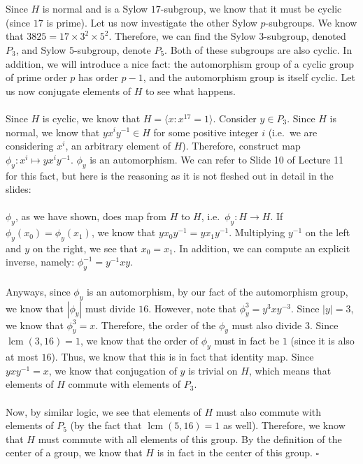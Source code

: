 \documentclass[letterpaper]{article}
\newcommand*{\QED}{\hfill\ensuremath{\square}}%
\DeclareMathOperator{\lcm}{lcm}
\begin{document}
\section{}
\label{sec:Question5}

Since $ H $ is normal and is a Sylow $ 17 $-subgroup, we know that it must be cyclic (since $ 17 $ is prime).
Let us now investigate the other Sylow $ p $-subgroups.
We know that $ 3825 = 17 \times 3^2 \times 5^2 $.
Therefore, we can find the Sylow $ 3 $-subgroup, denoted $ P_3 $, and Sylow $ 5 $-subgroup, denote $ P_5 $.
Both of these subgroups are also cyclic.
In addition, we will introduce a nice fact: the automorphism group of a cyclic group of prime order $ p $ has order $ p - 1 $, and the automorphism group is itself cyclic.
Let us now conjugate elements of $ H $ to see what happens.
\\ \\
Since $ H $ is cyclic, we know that $ H = \langle x : x^{17} = 1 \rangle $.
Consider $ y \in P_3 $.
Since $ H $ is normal, we know that $ y x^i y^{-1} \in H $ for some positive integer $ i $ (i.e.\ we are considering $ x^i $, an arbitrary element of $ H $).
Therefore, construct map $ \phi_y : x^i \mapsto y x^i y^{-1} $.
$ \phi_y $ is an automorphism.
We can refer to Slide 10 of Lecture 11 for this fact, but here is the reasoning as it is not fleshed out in detail in the slides:
\\ \\
$ \phi_y $, as we have shown, does map from $ H $ to $ H $, i.e.\ $ \phi_y : H \to H $.
If $ \phi_y (x_0) = \phi_y(x_1) $, we know that $ y x_0 y^{-1} = y x_1 y^{-1} $.
Multiplying $ y^{-1} $ on the left and $ y $ on the right, we see that $ x_0 = x_1 $.
In addition, we can compute an explicit inverse, namely: $ \phi_y^{-1} = y^{-1} x y $.
\\ \\
Anyways, since $ \phi_y $ is an automorphism, by our fact of the automorphism group, we know that $ | \phi_y | $ must divide $ 16 $.
However, note that $ \phi_y^3 = y^{3} x y^{-3} $.
Since $ |y| = 3 $, we know that $ \phi_y^3 = x $.
Therefore, the order of the $ \phi_y $ must also divide $ 3 $.
Since $ \lcm{(3, 16)} = 1 $, we know that the order of $ \phi_y $ must in fact be $ 1 $ (since it is also at most $ 16 $).
Thus, we know that this is in fact that identity map.
Since $ y x y^{-1} = x $, we know that conjugation of $ y $ is trivial on $ H $, which means that elements of $ H $ commute with elements of $ P_3 $.
\\ \\
Now, by similar logic, we see that elements of $ H $ must also commute with elements of $ P_5 $ (by the fact that $ \lcm{(5, 16)} = 1 $ as well).
Therefore, we know that $ H $ must commute with all elements of this group.
By the definition of the center of a group, we know that $ H $ is in fact in the center of this group.
\QED{}
\end{document}
